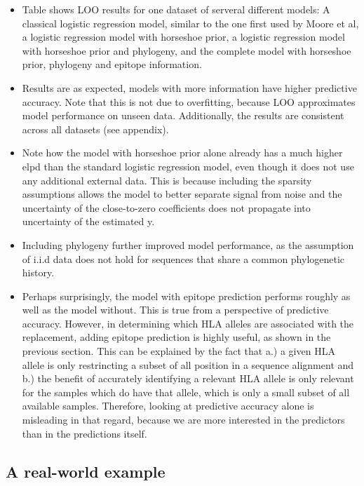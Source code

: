 \documentclass[fleqn,11pt]{SelfArx} %
\begin{document}
\begin{itemize}
  \item Table shows LOO results for one dataset of serveral different models: A classical logistic regression model, similar to the one first used by Moore et al, a logistic regression model with horseshoe prior, a logistic regression model with horseshoe prior and phylogeny, and the complete model with horseshoe prior, phylogeny and epitope information. 
  \item Results are as expected, models with more information have higher predictive accuracy. Note that this is not due to overfitting, because LOO approximates model performance on unseen data. Additionally, the results are consistent across all datasets (see appendix).
  \item Note how the model with horseshoe prior alone already has a much higher elpd than the standard logistic regression model, even though it does not use any additional external data. This is because including the sparsity assumptions allows the model to better separate signal from noise and the uncertainty of the close-to-zero coefficients does not propagate into uncertainty of the estimated y.
  \item Including phylogeny further improved model performance, as the assumption of i.i.d data does not hold for sequences that share a common phylogenetic history.
  \item Perhaps surprisingly, the model with epitope prediction performs roughly as well as the model without. This is true from a perspective of predictive accuracy. However, in determining which HLA alleles are associated with the replacement, adding epitope prediction is highly useful, as shown in the previous section. This can be explained by the fact that a.) a given HLA allele is only restrincting a subset of all position in a sequence alignment and b.) the benefit of accurately identifying a relevant HLA allele is only relevant for the samples which do have that allele, which is only a small subset of all available samples. Therefore, looking at predictive accuracy alone is misleading in that regard, because we are more interested in the predictors than in the predictions itself.
\end{itemize}

\subsection{A real-world example}
\end{document}
